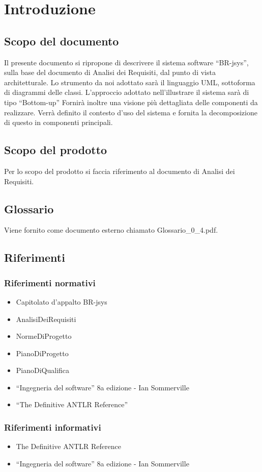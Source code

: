 \documentclass[11pt,titlepage,a4paper]{report}
\begin{document}
\chapter{Introduzione}
\section{Scopo del documento}
Il presente documento si ripropone di descrivere il sistema software ``BR-jsys'', sulla base del documento di Analisi dei Requisiti, dal punto di vista architetturale. Lo strumento da noi adottato sar\`a il linguaggio UML, sottoforma di diagrammi delle classi. L'approccio adottato nell'illustrare il sistema sar\`a di tipo ``Bottom-up'' Fornir\`a inoltre una visione pi\`u dettagliata delle componenti da realizzare.
Verr\`a definito il contesto d'uso del sistema e fornita la decomposizione di questo in componenti principali.
\section{Scopo del prodotto}
Per lo scopo del prodotto si faccia riferimento al documento di Analisi dei Requisiti.
\section{Glossario}
Viene fornito come documento esterno chiamato Glossario\_0\_4.pdf.
\section{Riferimenti}
\subsection{Riferimenti normativi}
\begin{itemize}
\item Capitolato d'appalto BR-jsys
\item AnalisiDeiRequisiti
\item NormeDiProgetto
\item PianoDiProgetto
\item PianoDiQualifica
\item ``Ingegneria del software'' 8a edizione - Ian Sommerville 
\item ``The Definitive ANTLR Reference''
\end{itemize}
\subsection{Riferimenti informativi}
\begin{itemize}
\item The Definitive ANTLR Reference
\item ``Ingegneria del software'' 8a edizione - Ian Sommerville
\end{itemize}
\end{document}
